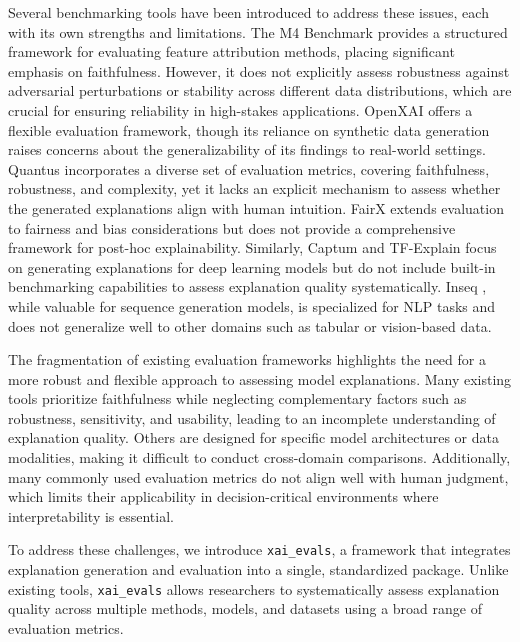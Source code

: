 Several benchmarking tools have been introduced to address these issues, each with its own strengths and limitations. The M4 Benchmark \cite{10.5555/3666122.3666203} provides a structured framework for evaluating feature attribution methods, placing significant emphasis on faithfulness. However, it does not explicitly assess robustness against adversarial perturbations or stability across different data distributions, which are crucial for ensuring reliability in high-stakes applications. OpenXAI \cite{agarwal2024openxaitransparentevaluationmodel} offers a flexible evaluation framework, though its reliance on synthetic data generation raises concerns about the generalizability of its findings to real-world settings. Quantus \cite{hedström2023quantusexplainableaitoolkit} incorporates a diverse set of evaluation metrics, covering faithfulness, robustness, and complexity, yet it lacks an explicit mechanism to assess whether the generated explanations align with human intuition. FairX \cite{sikder2024fairxcomprehensivebenchmarkingtool} extends evaluation to fairness and bias considerations but does not provide a comprehensive framework for post-hoc explainability. Similarly, Captum \cite{kokhlikyan2020captumunifiedgenericmodel} and TF-Explain \cite{Meudec2021-le} focus on generating explanations for deep learning models but do not include built-in benchmarking capabilities to assess explanation quality systematically. Inseq \cite{Sarti_2023}, while valuable for sequence generation models, is specialized for NLP tasks and does not generalize well to other domains such as tabular or vision-based data.  

The fragmentation of existing evaluation frameworks highlights the need for a more robust and flexible approach to assessing model explanations. Many existing tools prioritize faithfulness while neglecting complementary factors such as robustness, sensitivity, and usability, leading to an incomplete understanding of explanation quality. Others are designed for specific model architectures or data modalities, making it difficult to conduct cross-domain comparisons. Additionally, many commonly used evaluation metrics do not align well with human judgment, which limits their applicability in decision-critical environments where interpretability is essential.  

To address these challenges, we introduce \texttt{xai\_evals}, a framework that integrates explanation generation and evaluation into a single, standardized package. Unlike existing tools, \texttt{xai\_evals} allows researchers to systematically assess explanation quality across multiple methods, models, and datasets using a broad range of evaluation metrics.
